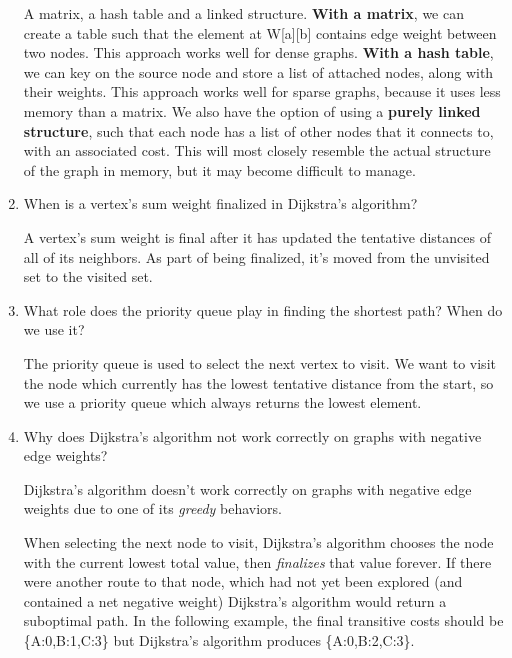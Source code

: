 \documentclass[11pt]{article}
\newenvironment{answer}{\large\lstset{basicstyle=\large}\color{white}}{}
\newenvironment{answer}{\large\lstset{basicstyle=\large}\color{red}}{}
\begin{document}
\begin{enumerate}
    \begin{answer}
    A matrix, a hash table and a linked structure.
    {\bf With a matrix}, we can create a table such that the element at W[a][b]
    contains edge weight between two nodes. This approach works well for dense
    graphs.
    {\bf With a hash table}, we can key on the source node and store a list of
    attached nodes, along with their weights. This approach works well for
    sparse graphs, because it uses less memory than a matrix.
    We also have the option of using a {\bf purely linked structure}, such that
    each node has a list of other nodes that it connects to, with an associated
    cost. This will most closely resemble the actual structure of the graph in
    memory, but it may become difficult to manage.
    \end{answer}

\item When is a vertex's sum weight finalized in Dijkstra's algorithm?

    \begin{answer}
    A vertex's sum weight is final after it has updated the tentative distances
    of all of its neighbors. As part of being finalized, it's moved from the
    unvisited set to the visited set.
    \end{answer}

\item What role does the priority queue play in finding the shortest path?
      When do we use it?

    \begin{answer}
    The priority queue is used to select the next vertex to visit. We want to
    visit the node which currently has the lowest tentative distance from the
    start, so we use a priority queue which always returns the lowest element.
    \end{answer}

\item Why does Dijkstra's algorithm not work correctly on graphs with negative
      edge weights?

    \begin{answer}
    Dijkstra's algorithm doesn't work correctly on graphs with negative edge
    weights due to one of its {\em greedy} behaviors.

    When selecting the next node to visit, Dijkstra's algorithm chooses the
    node with the current lowest total value, then {\em finalizes} that value
    forever. If there were another route to that node, which had not yet been
    explored (and contained a net negative weight) Dijkstra's algorithm would
    return a suboptimal path. In the following example, the final transitive
    costs should be \{A:0,B:1,C:3\} but Dijkstra's algorithm produces
    \{A:0,B:2,C:3\}.


\end{answer}
\end{enumerate}
\end{document}
